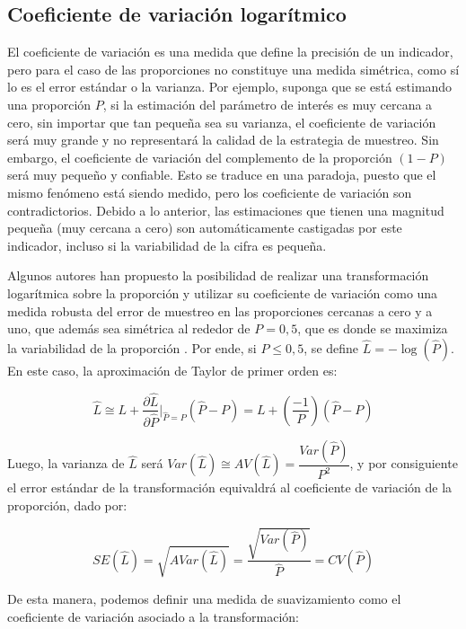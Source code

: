 \documentclass[
  12pt,
]{book}
\begin{document}
\hypertarget{coeficiente-de-variaciuxf3n-logaruxedtmico}{%
\subsection{Coeficiente de variación logarítmico}\label{coeficiente-de-variaciuxf3n-logaruxedtmico}}

El coeficiente de variación es una medida que define la precisión de un indicador, pero para el caso de las proporciones no constituye una medida simétrica, como sí lo es el error estándar o la varianza. Por ejemplo, suponga que se está estimando una proporción \(P\), si la estimación del parámetro de interés es muy cercana a cero, sin importar que tan pequeña sea su varianza, el coeficiente de variación será muy grande y no representará la calidad de la estrategia de muestreo. Sin embargo, el coeficiente de variación del complemento de la proporción \((1-P)\) será muy pequeño y confiable. Esto se traduce en una paradoja, puesto que el mismo fenómeno está siendo medido, pero los coeficiente de variación son contradictorios. Debido a lo anterior, las estimaciones que tienen una magnitud pequeña (muy cercana a cero) son automáticamente castigadas por este indicador, incluso si la variabilidad de la cifra es pequeña.

Algunos autores han propuesto la posibilidad de realizar una transformación logarítmica sobre la proporción y utilizar su coeficiente de variación como una medida robusta del error de muestreo en las proporciones cercanas a cero y a uno, que además sea simétrica al rededor de \(P=0,5\), que es donde se maximiza la variabilidad de la proporción \citep{Barnett_Walker_Chromy_Davis_Emrich_Odom_Packer_2003}. Por ende, si \(P\leq 0,5\), se define \(\hat L = -\log( \hat P)\). En este caso, la aproximación de Taylor de primer orden es:

\[
\hat{L} \cong L + \frac{\partial \hat{L}}{\partial \hat{P}}\biggr\rvert_{\hat{P}=P} (\hat{P}-P) = L + \left(\frac{-1}{P}\right)(\hat{P}-P)
\]

Luego, la varianza de \(\hat{L}\) será \(Var(\hat{L})\cong AV(\hat{L}) = \dfrac{Var(\hat{P})}{P^2}\), y por consiguiente el error estándar de la transformación equivaldrá al coeficiente de variación de la proporción, dado por:

\[
SE(\hat{L}) = \sqrt{AVar(\hat{L})} = \dfrac{\sqrt{Var(\hat{P})}}{\hat{P}} = CV(\hat{P}) 
\]

De esta manera, podemos definir una medida de suavizamiento como el coeficiente de variación asociado a la transformación:
\end{document}
